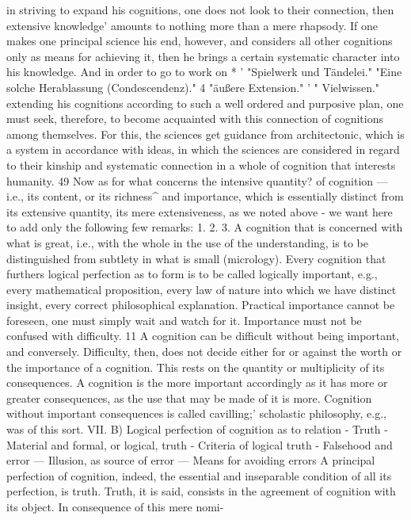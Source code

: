 in striving to expand his cognitions, one does not look to their connection,
then extensive knowledge' amounts to nothing more than a mere rhapsody.
If one makes one principal science his end, however, and considers all
other cognitions only as means for achieving it, then he brings a certain
systematic character into his knowledge. And in order to go to work on
*
' "Spielwerk und Tändelei."
"Eine solche Herablassung (Condescendenz)."
4 "äußere Extension."
'
" Vielwissen."
extending his cognitions according to such a well ordered and purposive
plan, one must seek, therefore, to become acquainted with this connection
of cognitions among themselves. For this, the sciences get guidance from
architectonic, which is a system in accordance with ideas, in which the sciences
are considered in regard to their kinship and systematic connection in a whole of
cognition that interests humanity.
49
Now as for what concerns the intensive quantity? of cognition — i.e., its
content, or its richness^ and importance, which is essentially distinct from
its extensive quantity, its mere extensiveness, as we noted above - we want
here to add only the following few remarks:
1.
2.
3.
A cognition that is concerned with what is great, i.e., with the whole in the use
of the understanding, is to be distinguished from subtlety in what is small
(micrology).
Every cognition that furthers logical perfection as to form is to be called
logically important, e.g., every mathematical proposition, every law of nature
into which we have distinct insight, every correct philosophical explanation.
Practical importance cannot be foreseen, one must simply wait and watch for it.
Importance must not be confused with difficulty. 11 A cognition can be difficult
without being important, and conversely. Difficulty, then, does not decide
either for or against the worth or the importance of a cognition. This rests on
the quantity or multiplicity of its consequences. A cognition is the more
important accordingly as it has more or greater consequences, as the use that
may be made of it is more. Cognition without important consequences is
called cavilling;' scholastic philosophy, e.g., was of this sort.
VII.
B) Logical perfection of cognition as to relation - Truth -Material
and formal, or logical, truth - Criteria of logical truth - Falsehood
and error — Illusion, as source of error — Means for avoiding errors
A principal perfection of cognition, indeed, the essential and inseparable
condition of all its perfection, is truth. Truth, it is said, consists in the
agreement of cognition with its object. In consequence of this mere nomi-
